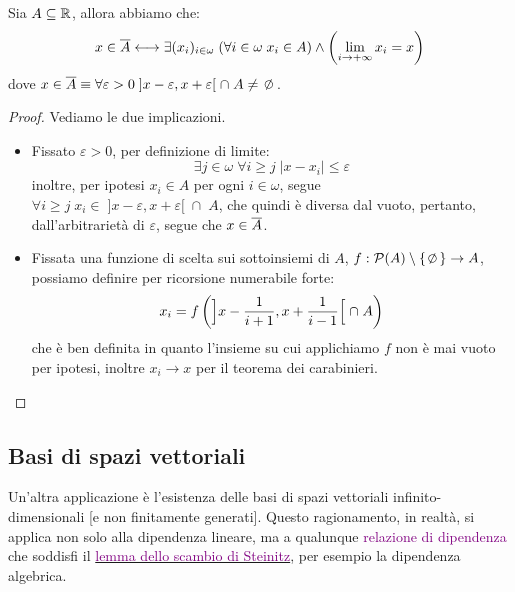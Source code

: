 \begin{proposition}
	Sia $A \subseteq \mathbb R$, allora abbiamo che:
	\[ x \in \ol A \longleftrightarrow \exists (x_i)_{i \in \omega} \; (\forall i \in \omega \; x_i \in A) \land \left(\lim_{i \to +\infty} x_i = x\right)
		\]
	dove $x \in \ol A \equiv \forall \varepsilon > 0 \; ]x - \varepsilon, x + \varepsilon[ \; \cap\; A \ne \emptyset$.
\end{proposition}

\begin{proof}
	Vediamo le due implicazioni.
	\begin{itemize}
		\item[$\boxed{\leftarrow}$] Fissato $\varepsilon > 0$, per definizione di limite:
		\[ \exists j \in \omega \; \forall i \geq j \; |x  - x_i| \leq \varepsilon
			\]
		inoltre, per ipotesi $x_i \in A$ per ogni $i \in \omega$, segue $\forall i \geq j \; x_i \in\; ]x - \varepsilon, x + \varepsilon[ \; \cap\; A$, che quindi \`e diversa dal vuoto, pertanto, dall'arbitrariet\`a di $\varepsilon$, segue che $x \in \overline A$.
		\item[$\boxed{\rightarrow}$] Fissata una funzione di scelta sui sottoinsiemi di $A$, $f : \ps(A) \setminus\{\emptyset\} \to A$, possiamo definire per ricorsione numerabile forte:
		\[ x_i = f\left(\Bigr]x - \frac{1}{i+1}, x + \frac{1}{i-1}\Bigl[ \; \cap \; A\right)
			\]
		che \`e ben definita in quanto l'insieme su cui applichiamo $f$ non \`e mai vuoto per ipotesi, inoltre $x_i \to x$ per il teorema dei carabinieri.
	\end{itemize}
\end{proof}

\subsection{Basi di spazi vettoriali}

Un'altra applicazione \`e l'esistenza delle basi di spazi vettoriali infinito-dimensionali [e non finitamente generati]. Questo ragionamento, in realt\`a, si applica non solo alla dipendenza lineare, ma a qualunque \textcolor{purple}{relazione di dipendenza}
che soddisfi il \href{https://en.wikipedia.org/wiki/Steinitz_exchange_lemma}{\textcolor{purple}{lemma dello scambio di Steinitz}}, per esempio la dipendenza algebrica.

